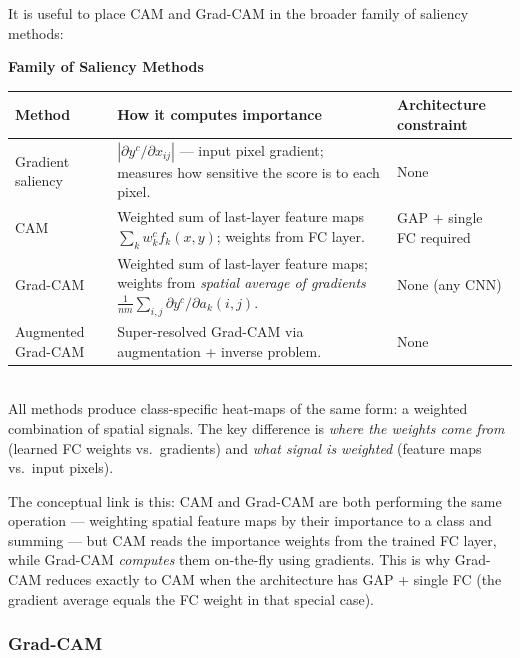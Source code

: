 \documentclass[11pt,a4paper]{article}
\begin{document}
It is useful to place CAM and Grad-CAM in the broader family of saliency methods:

\begin{tcolorbox}[colback=NoteGrayBg,colframe=NoteGray,boxrule=0.8pt,arc=3pt]
\textbf{Family of Saliency Methods}\\[4pt]
\begin{tabularx}{\linewidth}{@{}l X l@{}}
\toprule
\textbf{Method} & \textbf{How it computes importance} & \textbf{Architecture constraint} \\
\midrule
Gradient saliency & $\left|\partial y^c / \partial x_{ij}\right|$ — input pixel gradient; measures how sensitive the score is to each pixel. & None \\[4pt]
CAM & Weighted sum of last-layer feature maps $\sum_k w_k^c f_k(x,y)$; weights from FC layer. & GAP + single FC required \\[4pt]
Grad-CAM & Weighted sum of last-layer feature maps; weights from \emph{spatial average of gradients} $\frac{1}{nm}\sum_{i,j}\partial y^c/\partial a_k(i,j)$. & None (any CNN) \\[4pt]
Augmented Grad-CAM & Super-resolved Grad-CAM via augmentation + inverse problem. & None \\
\bottomrule
\end{tabularx}\\[4pt]
All methods produce class-specific heat-maps of the same form: a weighted combination of spatial signals. The key difference is \emph{where the weights come from} (learned FC weights vs.\ gradients) and \emph{what signal is weighted} (feature maps vs.\ input pixels).
\end{tcolorbox}

The conceptual link is this: CAM and Grad-CAM are both performing the same operation — weighting spatial feature maps by their importance to a class and summing — but CAM reads the importance weights from the trained FC layer, while Grad-CAM \emph{computes} them on-the-fly using gradients. This is why Grad-CAM reduces exactly to CAM when the architecture has GAP + single FC (the gradient average equals the FC weight in that special case).

\subsubsection{Grad-CAM}
\label{sec:gradcam2}
\end{document}
